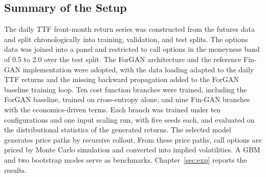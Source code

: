 \subsection{Summary of the Setup}\label{sec:method-summary}
The daily TTF front-month return series was constructed from the futures data and split chronologically into training, validation, and test splits. The options data was joined into a panel and restricted to call options in the moneyness band of \num{0.5} to \num{2.0} over the test split. The ForGAN architecture and the reference Fin-GAN implementation were adopted, with the data loading adapted to the daily TTF returns and the missing backward propagation added to the ForGAN baseline training loop. Ten cost function branches were trained, including the ForGAN baseline, trained on cross-entropy alone, and nine Fin-GAN branches with the economics-driven terms. Each branch was trained under ten configurations and one input scaling run, with five seeds each, and evaluated on the distributional statistics of the generated returns. The selected model generates price paths by recursive rollout. From these price paths, call options are priced by Monte Carlo simulation and converted into implied volatilities. A GBM and two bootstrap modes serve as benchmarks. Chapter~\ref{sec:exp} reports the results.